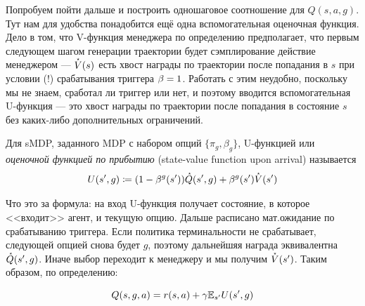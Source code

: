 Попробуем пойти дальше и построить одношаговое соотношение для $Q(s, a, g)$. Тут нам для удобства понадобится ещё одна вспомогательная оценочная функция. Дело в том, что V-функция менеджера по определению предполагает, что первым следующем шагом генерации траектории будет сэмплирование действие менеджером --- $\accentset{\star}{V}(s)$ есть хвост награды по траектории после попадания в $s$ при условии (!) срабатывания триггера $\beta \HM= 1$. Работать с этим неудобно, поскольку мы не знаем, сработал ли триггер или нет, и поэтому вводится вспомогательная U-функция --- это хвост награды по траектории после попадания в состояние $s$ без каких-либо дополнительных ограничений.

\begin{definition}
Для sMDP, заданного MDP с набором опций $\{\pi_g, \beta_g\}$, U-функцией или \emph{оценочной функцией по прибытию} (state-value function upon arrival) называется
\begin{equation}\label{Ufunction}
U(s', g) \coloneqq (1 - \beta^g(s'))\accentset{\star}{Q}(s', g) + \beta^g(s') \accentset{\star}{V}(s')
\end{equation}
\end{definition}

Что это за формула: на вход U-функция получает состояние, в которое <<входит>> агент, и текущую опцию. Дальше расписано мат.ожидание по срабатыванию триггера. Если политика терминальности не срабатывает, следующей опцией снова будет $g$, поэтому дальнейшяя награда эквивалентна $\accentset{\star}{Q}(s', g)$. Иначе выбор переходит к менеджеру и мы получим $\accentset{\star}{V}(s')$. Таким образом, по определению:

\begin{proposition}
\begin{equation}\label{QU}
Q(s, g, a) = r(s, a) + \gamma \mathbb{E}_{s'} U(s', g)
\end{equation}
\end{proposition}


